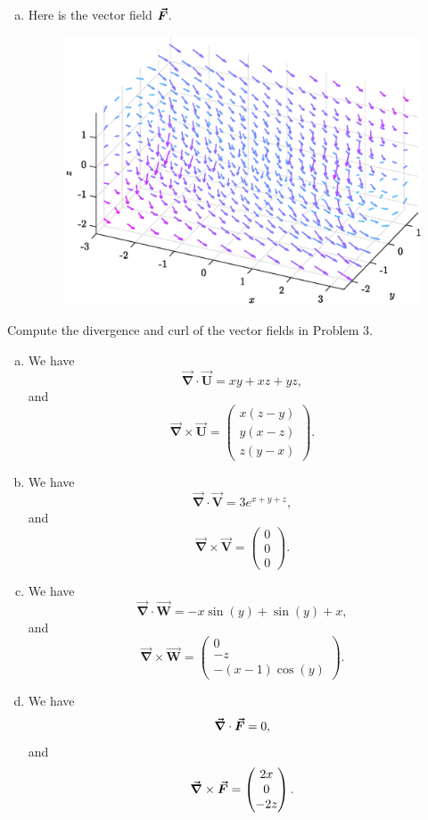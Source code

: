 \documentclass[12pt]{article} %
\newcommand{\grad}{\boldsymbol{\vec{\nabla}}}
\newcommand{\vecfieldV}{\boldsymbol{\vec{V}}}
\newcommand{\vecfieldU}{\boldsymbol{\vec{U}}}
\newcommand{\vecfieldW}{\boldsymbol{\vec{W}}}
\begin{document}
\begin{solution}
\begin{enumerate}[(a)]
\begin{figure}[H]
    \end{figure}
    \item Here is the vector field $\boldsymbol{\vec{F}}$.
    \begin{figure}[H]
        \centering
        \includegraphics[width=.65\textwidth]{figures/2d}
    \end{figure}
\end{enumerate}
\end{solution}

\newpage
\begin{problem}
Compute the divergence and curl of the vector fields in Problem 3.
\end{problem}
\begin{solution}
\begin{enumerate}[(a)]
    \item We have
    \[
    \grad \cdot \vecfieldU = xy + xz + yz,
    \]
    and
    \[
    \grad \times \vecfieldU = \begin{pmatrix} x(z-y) \\ y(x-z) \\ z(y-x) \end{pmatrix}.
    \]
    \item We have
    \[
    \grad \cdot \vecfieldV = 3e^{x+y+z},
    \]
    and
    \[
    \grad \times \vecfieldV = \begin{pmatrix} 0 \\ 0 \\ 0 \end{pmatrix}.
    \]
    \item We have
    \[
    \grad \cdot \vecfieldW = -x\sin(y)+\sin(y)+x,
    \]
    and
    \[
    \grad \times \vecfieldW = \begin{pmatrix} 0 \\ -z \\ -(x-1)\cos(y) \end{pmatrix}.
    \]
    \item We have
    \[
    \grad \cdot \forcevec = 0,
    \]
    and
    \[
    \grad \times \forcevec = \begin{pmatrix} 2x \\ 0 \\ -2z \end{pmatrix}.
    \]
\end{enumerate}
\end{solution}
\end{document}
